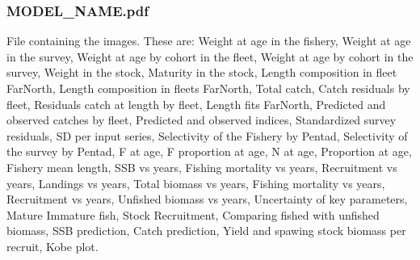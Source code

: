 \documentclass{article}
\begin{document}
    \subsubsection{MODEL\_NAME.pdf} File containing the images. These are: Weight at age in the fishery, Weight at age in the survey, Weight at age by cohort in the fleet, Weight at age by cohort in the survey, Weight in the stock, Maturity in the stock, Length composition in fleet FarNorth, Length composition in fleets FarNorth, Total catch, Catch residuals by fleet, Residuals catch at length by fleet, Length fits FarNorth, Predicted and observed catches by fleet, Predicted and observed indices, Standardized survey residuals, SD per input series, Selectivity of the Fishery by Pentad, Selectivity of the survey by Pentad, F at age, F proportion at age, N at age, Proportion at age, Fishery mean length, SSB vs years,  Fishing mortality vs years, Recruitment vs years, Landings vs years, Total biomass vs years, Fishing mortality vs years, Recruitment vs years, Unfished biomass vs years, Uncertainty of key parameters, Mature Immature fish, Stock Recruitment, Comparing fished with unfished biomass, SSB prediction, Catch prediction, Yield and spawing stock biomass per recruit, Kobe plot. 









    
\end{document}
